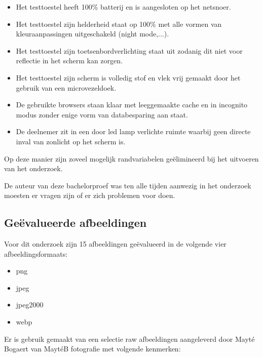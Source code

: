 \begin{itemize}
	\item Het testtoestel heeft 100\% batterij en is aangesloten op het netsnoer.
	
	\item Het testtoestel zijn helderheid staat op 100\% met alle vormen van kleuraanpassingen uitgeschakeld (night mode,...).
	
	\item Het testtoestel zijn toetsenbordverlichting staat uit zodanig dit niet voor reflectie in het scherm kan zorgen.
	
	\item Het testtoestel zijn scherm is volledig stof en vlek vrij gemaakt door het gebruik van een microvezeldoek.
	
	\item De gebruikte browsers staan klaar met leeggemaakte cache en in incognito modus zonder enige vorm van databesparing aan staat.
	
	\item De deelnemer zit in een door led lamp verlichte ruimte waarbij geen directe inval van zonlicht op het scherm is.
\end{itemize}

Op deze manier zijn zoveel mogelijk randvariabelen geëlimineerd bij het uitvoeren van het onderzoek.

De auteur van deze bachelorproef was ten alle tijden aanwezig in het onderzoek moesten er vragen zijn of er zich problemen voor doen.

\subsection{Geëvalueerde afbeeldingen}
\label{sec:onderzoek-uitvoering-afbeeldingsformaten}

Voor dit onderzoek zijn 15 afbeeldingen geëvalueerd in de volgende vier \glspl{afbeeldingsformaat}: 

\begin{itemize}
	\item \gls{png}
	
	\item \gls{jpeg}
	
	\item \gls{jpeg2000}
	
	\item \gls{webp}
\end{itemize}

Er is gebruik gemaakt van een selectie \gls{raw} afbeeldingen aangeleverd door Mayté Bogaert van MaytéB fotografie met volgende kenmerken:

